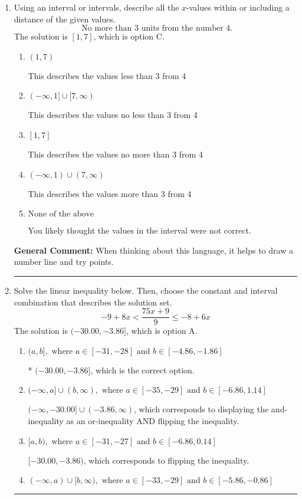 \documentclass{extbook}[14pt]
\newcommand{\litem}[1]{\item #1

\rule{\textwidth}{0.4pt}}
\begin{document}
\begin{enumerate}
{\textbf{General Comment:} Remember that less/greater than or equal to includes the endpoint, while less/greater do not. Also, remember that you need to flip the inequality when you multiply or divide by a negative.
}
\litem{
Using an interval or intervals, describe all the $x$-values within or including a distance of the given values.
\[ \text{ No more than } 3 \text{ units from the number } 4. \]The solution is \( [1, 7] \), which is option C.\begin{enumerate}[label=\Alph*.]
\item \( (1, 7) \)

This describes the values less than 3 from 4
\item \( (-\infty, 1] \cup [7, \infty) \)

This describes the values no less than 3 from 4
\item \( [1, 7] \)

This describes the values no more than 3 from 4
\item \( (-\infty, 1) \cup (7, \infty) \)

This describes the values more than 3 from 4
\item \( \text{None of the above} \)

You likely thought the values in the interval were not correct.
\end{enumerate}

\textbf{General Comment:} When thinking about this language, it helps to draw a number line and try points.
}
\litem{
Solve the linear inequality below. Then, choose the constant and interval combination that describes the solution set.
\[ -9 + 8 x < \frac{75 x + 9}{9} \leq -8 + 6 x \]The solution is \( (-30.00, -3.86] \), which is option A.\begin{enumerate}[label=\Alph*.]
\item \( (a, b], \text{ where } a \in [-31, -28] \text{ and } b \in [-4.86, -1.86] \)

* $(-30.00, -3.86]$, which is the correct option.
\item \( (-\infty, a] \cup (b, \infty), \text{ where } a \in [-35, -29] \text{ and } b \in [-6.86, 1.14] \)

$(-\infty, -30.00] \cup (-3.86, \infty)$, which corresponds to displaying the and-inequality as an or-inequality AND flipping the inequality.
\item \( [a, b), \text{ where } a \in [-31, -27] \text{ and } b \in [-6.86, 0.14] \)

$[-30.00, -3.86)$, which corresponds to flipping the inequality.
\item \( (-\infty, a) \cup [b, \infty), \text{ where } a \in [-33, -29] \text{ and } b \in [-5.86, -0.86] \)


\end{enumerate}}
\end{enumerate}
\end{document}
